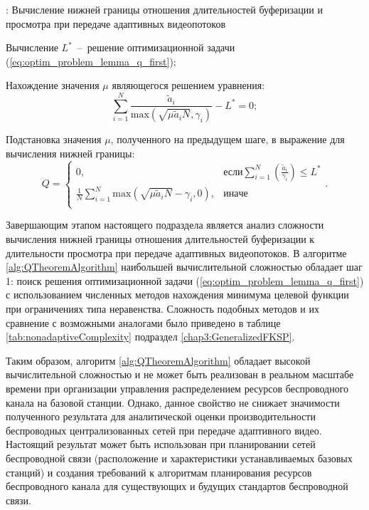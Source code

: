 \begin{algorithm}
  \caption{: Вычисление нижней границы отношения длительностей буферизации и просмотра при передаче адаптивных видеопотоков}
	\label{alg:QTheoremAlgorithm}
  \begin{algorithmic}[1]
	 \item Вычисление $L^{*}$~--~решение оптимизационной задачи (\ref{eq:optim_problem_lemma_q_first});
	 \item Нахождение значения $\mu$ являющегося решением уравнения: $$\sum\limits_{i=1}^{N} {\frac{\tilde{a}_i}{\mathrm{max} \left(\sqrt{\mu \tilde{a}_i N}, \gamma_i\right)}} - L^{*} = 0;$$
	\item Подстановка значения $\mu$, полученного на предыдущем шаге, в выражение для вычисления нижней границы:
	$$Q =
	\begin{cases}
	0, & \text{если} \sum\limits_{i=1}^{N} {\left(\frac{\tilde{a}_i}{\gamma_i}\right)} \leq L^{*}\\
	\frac{1}{N} \sum\limits_{i=1}^{N} {\mathrm{max} \left(\sqrt{\mu \tilde{a}_i N}-\gamma_i, 0\right)}, & \mathrm{иначе} \\
	\end{cases}.$$
  \end{algorithmic}
\end{algorithm}

Завершающим этапом настоящего подраздела является анализ сложности вычисления нижней границы отношения длительностей буферизации к длительности просмотра при передаче адаптивных видеопотоков. В алгоритме \ref{alg:QTheoremAlgorithm} наибольшей вычислительной сложностью обладает шаг 1: поиск решения оптимизационной задачи (\ref{eq:optim_problem_lemma_q_first}) с использованием численных методов нахождения минимума целевой функции при ограничениях типа неравенства. Сложность подобных методов и их сравнение с возможными аналогами было приведено в таблице \ref{tab:nonadaptiveComplexity} подраздел \ref{chap3:GeneralizedFKSP}.

Таким образом, алгоритм \ref{alg:QTheoremAlgorithm} обладает высокой вычислительной сложностью и не может быть реализован в реальном масштабе времени при организации управления распределением ресурсов беспроводного канала на базовой станции. Однако, данное свойство не снижает значимости полученного результата для аналитической оценки производительности беспроводных централизованных сетей при передаче адаптивного видео. Настоящий результат может быть использован при планировании сетей беспроводной связи (расположение и характеристики устанавливаемых базовых станций) и создания требований к алгоритмам планирования ресурсов беспроводного канала для существующих и будущих стандартов беспроводной связи.

